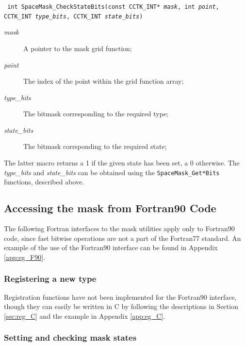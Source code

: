 \documentclass{article}
\begin{document}
\indent\parbox{\linewidth}{
\vspace{\baselineskip}\noindent\texttt{
int SpaceMask\_CheckStateBits(const CCTK\_INT* \emph{mask}, int \emph{point},
  \\\hspace*{10mm}
  CCTK\_INT \emph{type\_bits}, CCTK\_INT \emph{state\_bits})
}\\
\hspace*{10mm}\parbox{\linewidth}{
\begin{description}
  \item[\emph{mask}] A pointer to the mask grid function;
  \item[\emph{point}] The index of the point within the grid function
    array;
  \item[\emph{type\_bits}] The bitmask corresponding to the required
    type;
  \item[\emph{state\_bits}] The bitmask corrsponding to the required
    state;
\end{description}
}}

\noindent The latter macro returns a 1 if the given state has been
set, a 0 otherwise. The \emph{type\_bits} and \emph{state\_bits} can
be obtained using the \texttt{SpaceMask\_Get*Bits} functions,
described above.

\subsection{Accessing the mask from Fortran90 Code}

The following Fortran interfaces to the mask utilities apply only to
Fortran90 code, since fast bitwise operations are not a part of the
Fortran77 standard. An example of the use of the Fortran90 interface
can be found in Appendix \ref{app:eg_F90}.

\subsubsection{Registering a new type}

Registration functions have not been implemented for the Fortran90
interface, though they can easily be written in C by following the
descriptions in Section \ref{sec:reg_C} and the example in Appendix
\ref{app:eg_C}.

\subsubsection{Setting and checking mask states}
\end{document}
